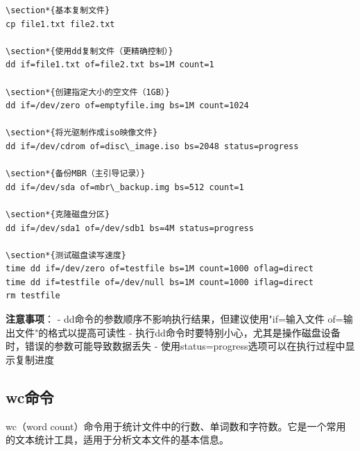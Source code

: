 \documentclass[12pt,UTF8]{ctexbook}
\begin{document}
\begin{verbatim}
\section*{基本复制文件}
cp file1.txt file2.txt

\section*{使用dd复制文件（更精确控制）}
dd if=file1.txt of=file2.txt bs=1M count=1

\section*{创建指定大小的空文件（1GB）}
dd if=/dev/zero of=emptyfile.img bs=1M count=1024

\section*{将光驱制作成iso映像文件}
dd if=/dev/cdrom of=disc\_image.iso bs=2048 status=progress

\section*{备份MBR（主引导记录）}
dd if=/dev/sda of=mbr\_backup.img bs=512 count=1

\section*{克隆磁盘分区}
dd if=/dev/sda1 of=/dev/sdb1 bs=4M status=progress

\section*{测试磁盘读写速度}
time dd if=/dev/zero of=testfile bs=1M count=1000 oflag=direct
time dd if=testfile of=/dev/null bs=1M count=1000 iflag=direct
rm testfile
\end{verbatim}

\textbf{注意事项}：
- dd命令的参数顺序不影响执行结果，但建议使用"if=输入文件 of=输出文件"的格式以提高可读性
- 执行dd命令时要特别小心，尤其是操作磁盘设备时，错误的参数可能导致数据丢失
- 使用status=progress选项可以在执行过程中显示复制进度

\subsection{wc命令}
wc（word count）命令用于统计文件中的行数、单词数和字符数。它是一个常用的文本统计工具，适用于分析文本文件的基本信息。
\end{document}
